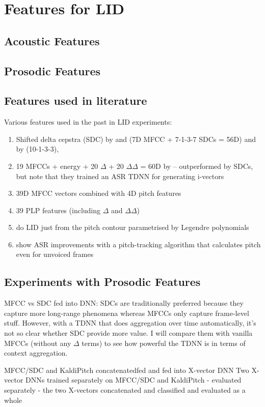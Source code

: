\documentclass[bsc,frontabs,twoside,singlespacing,parskip,deptreport]{infthesis}
\begin{document}
\chapter{Features for LID}{
  \section{Acoustic Features}{

  }
  \section{Prosodic Features}{

  }
  \section{Features used in literature}{
    Various features used in the past in LID experiments:
    \begin{enumerate}
    \item{Shifted delta cepstra (SDC) by \cite{Ferrer_et_al_2016} and \cite{Sarma_et_al_2018} (7D MFCC + 7-1-3-7 SDCs = 56D) and by \cite{Torres-Carrasquillo_et_al_2002} (10-1-3-3), }
    \item{19 MFCCs + energy + 20 $\Delta$ + 20 $\Delta\Delta$ = 60D by \cite{Sarma_et_al_2018} -- outperformed by SDCs, but note that they trained an ASR TDNN for generating i-vectors}
    \item{39D MFCC vectors combined with 4D pitch features \citep{Song_et_al_2013}}
    \item{39 PLP features (including $\Delta$ and $\Delta\Delta$) \citep{Lopez-Moreno_et_al_2014}}
    \item{\cite{Lin_et_al_2005} do LID just from the pitch contour parametrised by Legendre polynomials}
    \item{\cite{Ghahremani_et_al_2014} show ASR improvements with a pitch-tracking algorithm that calculates pitch even for unvoiced frames}
    \end{enumerate}
  }
  \section{Experiments with Prosodic Features}{
    MFCC vs SDC fed into DNN: SDCs are traditionally preferred because they capture more long-range phenomena whereas MFCCs only capture frame-level stuff. However, with a TDNN that does aggregation over time automatically, it's not so clear whether SDC provide more value. I will compare them with vanilla MFCCs (without any $\Delta$ terms) to see how powerful the TDNN is in terms of context aggregation.

    MFCC/SDC and KaldiPitch concatenatedfed and fed into X-vector DNN
    Two X-vector DNNs trained separately on MFCC/SDC and KaldiPitch
    - evaluated separately
    - the two X-vectors concatenated and classified and evaluated as a whole
  }
}




\end{document}
